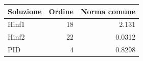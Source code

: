 \begin{tabular}{lrr}\toprule
Soluzione & Ordine & Norma comune\\\midrule
Hinf1 & 18 & \num{2.131}\\
Hinf2 & 22 & \num{0.0312}\\
PID & 4 & \num{0.8298}\\
\bottomrule\end{tabular}
